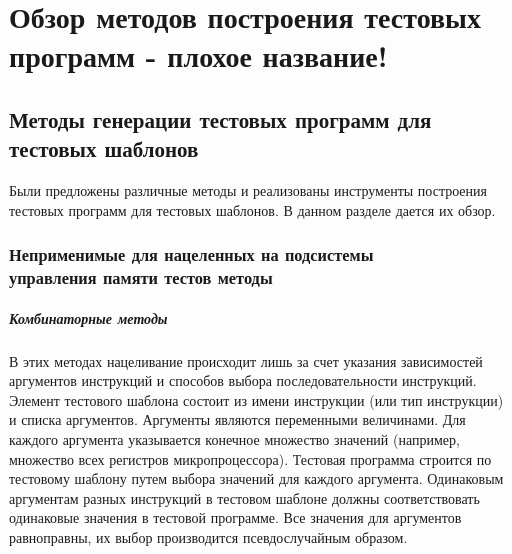 \chapter{Обзор методов построения тестовых программ - плохое название!}

\section{Методы генерации тестовых программ для тестовых шаблонов}

Были предложены различные методы и реализованы инструменты построения тестовых программ для тестовых шаблонов. В данном разделе дается их обзор.

\subsection{Неприменимые для нацеленных на подсистемы\\ управления памяти тестов методы}

\paragraph{Комбинаторные методы}

В этих методах нацеливание происходит лишь за счет указания зависимостей аргументов инструкций и способов выбора последовательности инструкций. Элемент тестового шаблона состоит из имени инструкции (или тип инструкции) и списка аргументов. Аргументы являются переменными величинами. Для каждого аргумента указывается конечное множество значений (например, множество всех регистров микропроцессора). Тестовая программа строится по тестовому шаблону путем выбора значений для каждого аргумента. Одинаковым аргументам разных инструкций в тестовом шаблоне должны соответствовать одинаковые значения в тестовой программе. Все значения для аргументов равноправны, их выбор производится псевдослучайным образом.

